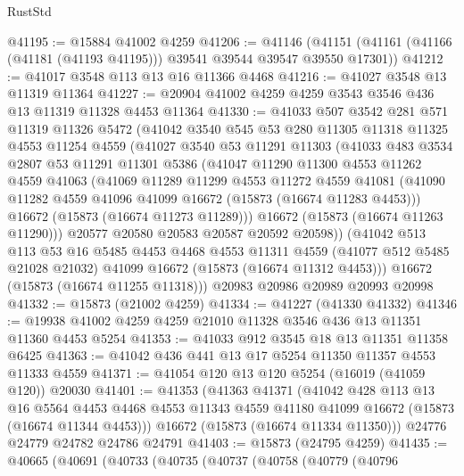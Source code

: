\begin{lexlean}{RustStd}
\begin{coremodule}
@41195 := @15884 @41002 @4259
@41206 := @41146
    (@41151 (@41161 (@41166 (@41181 (@41193 @41195))) @39541 @39544 @39547 @39550 @17301))
@41212 := @41017 @3548 @113 @13 @16 @11366 @4468
@41216 := @41027 @3548 @13 @11319 @11364
@41227 := @20904 @41002 @4259 @4259 @3543 @3546 @436 @13 @11319 @11328 @4453 @11364
@41330 := @41033
    @507
    @3542
    @281
    @571
    @11319
    @11326
    @5472
    (@41042
      @3540
      @545
      @53
      @280
      @11305
      @11318
      @11325
      @4553
      @11254
      @4559
      (@41027
        @3540
        @53
        @11291
        @11303
        (@41033
          @483
          @3534
          @2807
          @53
          @11291
          @11301
          @5386
          (@41047
            @11290
            @11300
            @4553
            @11262
            @4559
            @41063
            (@41069
              @11289
              @11299
              @4553
              @11272
              @4559
              @41081
              (@41090 @11282 @4559 @41096 @41099 @16672 (@15873 (@16674 @11283 @4453)))
              @16672
              (@15873 (@16674 @11273 @11289)))
            @16672
            (@15873 (@16674 @11263 @11290)))
          @20577
          @20580
          @20583
          @20587
          @20592
          @20598))
      (@41042
        @513
        @113
        @53
        @16
        @5485
        @4453
        @4468
        @4553
        @11311
        @4559
        (@41077 @512 @5485 @21028 @21032)
        @41099
        @16672
        (@15873 (@16674 @11312 @4453)))
      @16672
      (@15873 (@16674 @11255 @11318)))
    @20983
    @20986
    @20989
    @20993
    @20998
@41332 := @15873 (@21002 @4259)
@41334 := @41227 (@41330 @41332)
@41346 := @19938 @41002 @4259 @4259 @21010 @11328 @3546 @436 @13 @11351 @11360 @4453 @5254
@41353 := @41033 @912 @3545 @18 @13 @11351 @11358 @6425
@41363 := @41042 @436 @441 @13 @17 @5254 @11350 @11357 @4553 @11333 @4559
@41371 := @41054 @120 @13 @120 @5254 (@16019 (@41059 @120)) @20030
@41401 := @41353
    (@41363
      @41371
      (@41042
        @428
        @113
        @13
        @16
        @5564
        @4453
        @4468
        @4553
        @11343
        @4559
        @41180
        @41099
        @16672
        (@15873 (@16674 @11344 @4453)))
      @16672
      (@15873 (@16674 @11334 @11350)))
    @24776
    @24779
    @24782
    @24786
    @24791
@41403 := @15873 (@24795 @4259)
@41435 := @40665
    (@40691
      (@40733
        (@40735
          (@40737
            (@40758
              (@40779
                (@40796

\end{coremodule}
\end{lexlean}
